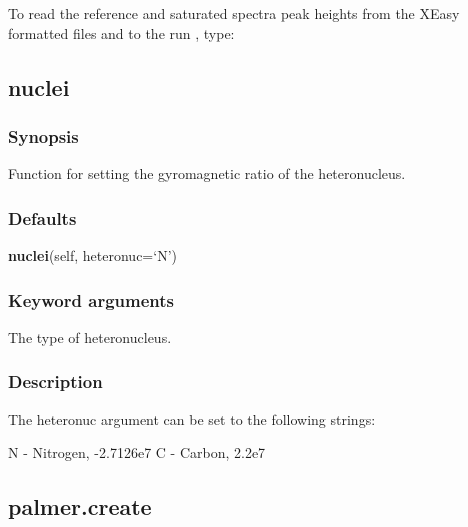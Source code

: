 


To read the reference and saturated spectra peak heights from the XEasy formatted files
 and 
 to the run 
, type:





\newpage

\subsection{nuclei}


\subsubsection{Synopsis}

Function for setting the gyromagnetic ratio of the heteronucleus.

\subsubsection{Defaults}

\textsf{\textbf{nuclei}(self, heteronuc=`N')}


\subsubsection{Keyword arguments}


  The type of heteronucleus.

\subsubsection{Description}

The heteronuc argument can be set to the following strings:

    N - Nitrogen, -2.7126e7
    C - Carbon, 2.2e7


\newpage

\subsection{palmer.create}


